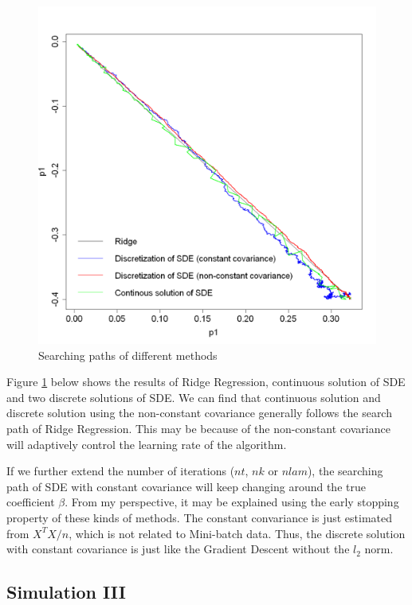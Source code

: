 \documentclass[11pt]{article}
\begin{document}
\begin{figure}[p]
\centering
\includegraphics[width=1\linewidth]{fig6.png}
\caption{Searching paths of different methods}
\label{fig:search}
\end{figure}

Figure \ref{fig:search} below shows the results of Ridge Regression, continuous solution of SDE and two discrete solutions of SDE. We can find that continuous solution and discrete solution using the non-constant covariance generally follows the search path of Ridge Regression. This may be because of the non-constant covariance will adaptively control the learning rate of the algorithm.

If we further extend the number of iterations ($nt$, $nk$ or $nlam$), the searching path of SDE with constant covariance will keep changing around the true coefficient $\beta$. From my perspective, it may be explained using the early stopping property of these kinds of methods. The constant convariance is just estimated from $X^TX/n$, which is not related to Mini-batch data. Thus, the discrete solution with constant covariance is just like the Gradient Descent without the $l_2$ norm.

\subsection{Simulation III}
\end{document}
